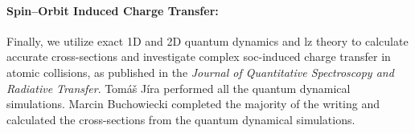 \paragraph{Spin--Orbit Induced Charge Transfer:} Finally, we utilize exact 1D and 2D quantum dynamics and \gls{lz} theory to calculate accurate cross-sections and investigate complex \gls{soc}-induced charge transfer in atomic collisions, as published in the \textit{Journal of Quantitative Spectroscopy and Radiative Transfer}. Tomáš Jíra performed all the quantum dynamical simulations. Marcin Buchowiecki completed the majority of the writing and calculated the cross-sections from the quantum dynamical simulations.



